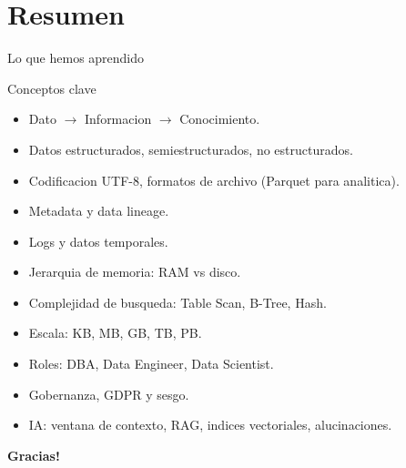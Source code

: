 \documentclass[aspectratio=169, 10pt, xcolor=table]{beamer}
\begin{document}
\section{Resumen}

\begin{frame}{Lo que hemos aprendido}
    \begin{exampleblock}{Conceptos clave}
        \begin{itemize}
            \item Dato $\rightarrow$ Informacion $\rightarrow$ Conocimiento.
            \item Datos estructurados, semiestructurados, no estructurados.
            \item Codificacion UTF-8, formatos de archivo (Parquet para analitica).
            \item Metadata y data lineage.
            \item Logs y datos temporales.
            \item Jerarquia de memoria: RAM vs disco.
            \item Complejidad de busqueda: Table Scan, B-Tree, Hash.
            \item Escala: KB, MB, GB, TB, PB.
            \item Roles: DBA, Data Engineer, Data Scientist.
            \item Gobernanza, GDPR y sesgo.
            \item IA: ventana de contexto, RAG, indices vectoriales, alucinaciones.
        \end{itemize}
    \end{exampleblock}
\end{frame}

\begin{frame}
    \centering
    \Huge \textbf{Gracias!}

\end{frame}
\end{document}
